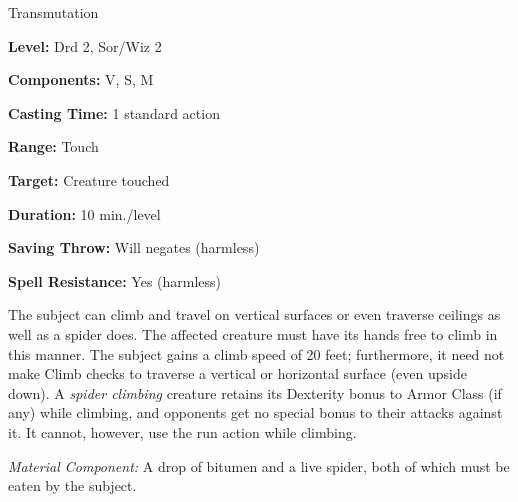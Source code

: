 
Transmutation

\textbf{Level:} Drd 2, Sor/Wiz 2

\textbf{Components:} V, S, M

\textbf{Casting Time:} 1 standard action

\textbf{Range:} Touch

\textbf{Target:} Creature touched

\textbf{Duration:} 10 min./level

\textbf{Saving Throw:} Will negates (harmless)

\textbf{Spell Resistance:} Yes (harmless)

The subject can climb and travel on vertical surfaces or even traverse ceilings 
as well as a spider does. The affected creature must have its hands free to climb 
in this manner. The subject gains a climb speed of 20 feet; furthermore, it need 
not make Climb checks to traverse a vertical or horizontal surface (even upside 
down). A \textit{spider climbing} creature retains its Dexterity bonus to Armor 
Class (if any) while climbing, and opponents get no special bonus to their attacks 
against it. It cannot, however, use the run action while climbing.

\textit{Material Component:} A drop of bitumen and a live spider, both of which 
must be eaten by the subject.

